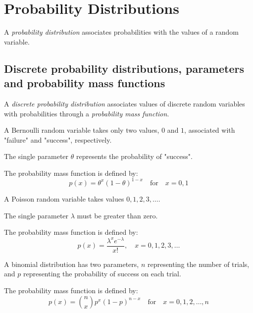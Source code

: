 \section{Probability Distributions}
A \textit{probability distribution} associates probabilities with the values of a random variable.  
\par\vspace{0.5 cm}
\subsection{Discrete probability distributions, parameters and probability mass functions}
A \textit{discrete probability distribution} associates values of discrete random variables with probabilities through a \textit{probability mass function}.
\par\vspace{0.5 cm}
\begin{example*} 
A Bernoulli random variable takes only two values, $0$ and $1$, associated with "failure" and "success", respectively. 
\par\vspace{0.5 cm}
The single parameter $\theta$ represents the probability of "success". 
\par\vspace{0.5 cm}
The probability mass function is defined by:
\[
p(x) = \theta^x(1-\theta)^{1-x}\quad\mbox{for}\quad x=0,1
\]
\end{example*}
\par\vspace{0.5 cm}
\begin{example*} 
A Poisson random variable takes values $0,1,2,3,\ldots$.
\par\vspace{0.5 cm}
The single parameter $\lambda$ must be greater than zero. 
\par\vspace{0.5 cm}
The probability mass function is defined by:
\[
p(x) = \frac{\lambda^xe^{-\lambda}}{x!},\quad x=0,1,2,3,\ldots
\]
\end{example*}
\par\vspace{0.5 cm}
\begin{example*} 
A binomial distribution has two parameters, $n$ representing the number of trials, and $p$ representing the probability of success on each trial.  
\par\vspace{0.5 cm}
The probability mass function is defined by:
\[
p(x) = {n\choose x}p^x(1-p)^{n-x}\quad\mbox{for}\quad x=0,1,2,\ldots,n
\]
\end{example*}
